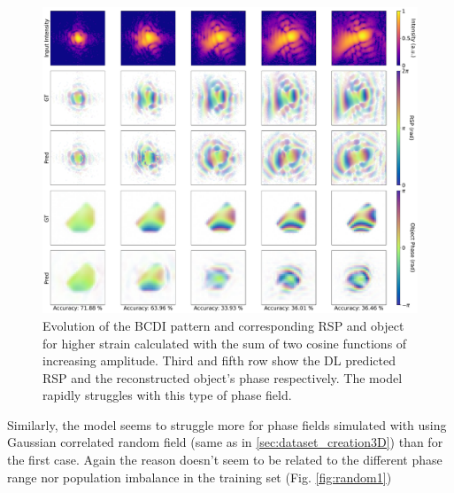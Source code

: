 \begin{figure}[H]
    \centering
    \includegraphics[width=\textwidth]{figures/Phasing/performance_cosine.pdf}
    \caption{Evolution of the BCDI pattern and corresponding RSP and object for higher strain calculated with the sum of 
    two cosine functions of increasing amplitude. Third and fifth row show the DL predicted RSP and the reconstructed 
    object's phase respectively. The model rapidly struggles with this type of phase field.}
    \label{fig:cosine}
\end{figure}

Similarly, the model seems to struggle more for phase fields simulated with using Gaussian correlated random field (same as
in \ref{sec:dataset_creation3D}) than for the first case. Again the reason doesn't seem to be related to the different 
phase range nor population imbalance in the training set (Fig. \ref{fig:random1})

